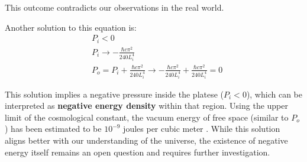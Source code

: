 This outcome contradicts our observations in the real world.

Another solution to this equation is:
\begin{align}
    &P_i < 0 \\
    &P_i \rightarrow -\frac{\hbar c \pi^2}{240 L_i^4} \\
    &P_o = P_i + \frac{\hbar c \pi^2}{240 L_i^4} \rightarrow -\frac{\hbar c \pi^2}{240 L_i^4} + \frac{\hbar c \pi^2}{240 L_i^4} = 0
\end{align}

This solution implies a negative pressure inside the platese ($P_i < 0$), which can be interpreted as \textbf{negative energy density} within that region.
Using the upper limit of the cosmological constant, the vacuum energy of free space (similar to $P_o$) has been estimated to be $10^{-9}$ joules per cubic meter \cite{estimatedVaccumEnergy}.
While this solution aligns better with our understanding of the universe, 
the existence of negative energy itself remains an open question and requires further investigation.
